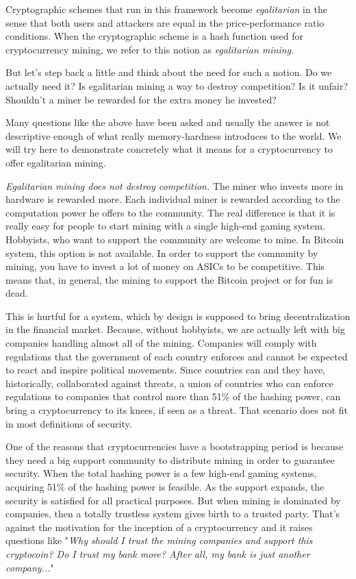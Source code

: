 Cryptographic schemes that run in this framework become \emph{egalitarian} in the sense that both users and attackers are equal in the price-performance ratio conditions. When the cryptographic scheme is a hash function used for cryptocurrency mining, we refer to this notion as \emph{egalitarian mining}.

But let's step back a little and think about the need for such a notion. Do we actually need it? Is egalitarian mining a way to destroy competition? Is it unfair? Shouldn't a miner be rewarded for the extra money he invested?

Many questions like the above have been asked and usually the answer is not descriptive enough of what really memory-hardness introduces to the world. We will try here to demonstrate concretely what it means for a cryptocurrency to offer egalitarian mining.

\emph{Egalitarian mining does not destroy competition.} The miner who invests more in hardware is rewarded more. Each individual miner is rewarded according to the computation power he offers to the community. The real difference is that it is really easy for people to start mining with a single high-end gaming system. Hobbyists, who want to support the community are welcome to mine. In Bitcoin system, this option is not available. In order to support the community by mining, you have to invest a lot of money on ASICs to be competitive. This means that, in general, the mining to support the Bitcoin project or for fun is dead.

This is hurtful for a system, which by design is supposed to bring decentralization in the financial market. Because, without hobbyists, we are actually left with big companies handling almost all of the mining. Companies will comply with regulations that the government of each country enforces and cannot be expected to react and inspire political movements. Since countries can and they have, historically, collaborated against threats, a union of countries who can enforce regulations to companies that control more than 51\% of the hashing power, can bring a cryptocurrency to its knees, if seen as a threat. That scenario does not fit in most definitions of security.

One of the reasons that cryptocurrencies have a bootstrapping period is because they need a big support community to distribute mining in order to guarantee security. When the total hashing power is a few high-end gaming systems, acquiring 51\% of the hashing power is feasible. As the support expands, the security is satisfied for all practical purposes. But when mining is dominated by companies, then a totally trustless system gives birth to a trusted party. That's against the motivation for the inception of a cryptocurrency and it raises questions like "\emph{Why should I trust the mining companies and support this cryptocoin? Do I trust my bank more? After all, my bank is just another company...}"
\pagebreak

